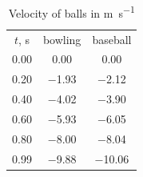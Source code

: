 \begin{table}
  \caption{Velocity of balls in \unit{\meter\per\second}}
  \label{tab:4}
  \begin{ruledtabular}
    \begin{tabular}{ccc}
      $t$, \unit{\second} & bowling & baseball \\
      \colrule
      \num{0.00} & \num{0.00} & \num{0.00} \\
      \num{0.20} & \num{-1.93} & \num{-2.12} \\
      \num{0.40} & \num{-4.02} & \num{-3.90} \\
      \num{0.60} & \num{-5.93} & \num{-6.05} \\
      \num{0.80} & \num{-8.00} & \num{-8.04} \\
      \num{0.99} & \num{-9.88} & \num{-10.06} \\
    \end{tabular}
  \end{ruledtabular}
\end{table}
